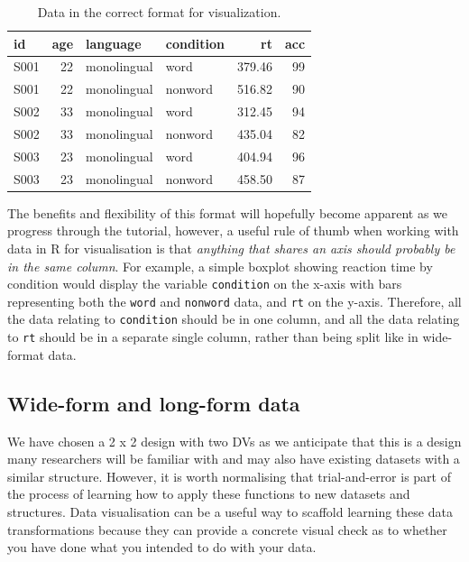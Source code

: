 \documentclass[
  english,
  doc,floatsintext]{apa6}
\begin{document}
\begin{table}

\caption{\label{tab:long}Data in the correct format for visualization.}
\centering
\begin{tabular}[t]{l|r|l|l|r|r}
\hline
id & age & language & condition & rt & acc\\
\hline
S001 & 22 & monolingual & word & 379.46 & 99\\
\hline
S001 & 22 & monolingual & nonword & 516.82 & 90\\
\hline
S002 & 33 & monolingual & word & 312.45 & 94\\
\hline
S002 & 33 & monolingual & nonword & 435.04 & 82\\
\hline
S003 & 23 & monolingual & word & 404.94 & 96\\
\hline
S003 & 23 & monolingual & nonword & 458.50 & 87\\
\hline
\end{tabular}
\end{table}

The benefits and flexibility of this format will hopefully become apparent as we progress through the tutorial, however, a useful rule of thumb when working with data in R for visualisation is that \emph{anything that shares an axis should probably be in the same column}. For example, a simple boxplot showing reaction time by condition would display the variable \texttt{condition} on the x-axis with bars representing both the \texttt{word} and \texttt{nonword} data, and \texttt{rt} on the y-axis. Therefore, all the data relating to \texttt{condition} should be in one column, and all the data relating to \texttt{rt} should be in a separate single column, rather than being split like in wide-format data.

\hypertarget{wide-form-and-long-form-data}{%
\subsection{Wide-form and long-form data}\label{wide-form-and-long-form-data}}

We have chosen a 2 x 2 design with two DVs as we anticipate that this is a design many researchers will be familiar with and may also have existing datasets with a similar structure. However, it is worth normalising that trial-and-error is part of the process of learning how to apply these functions to new datasets and structures. Data visualisation can be a useful way to scaffold learning these data transformations because they can provide a concrete visual check as to whether you have done what you intended to do with your data.
\end{document}
